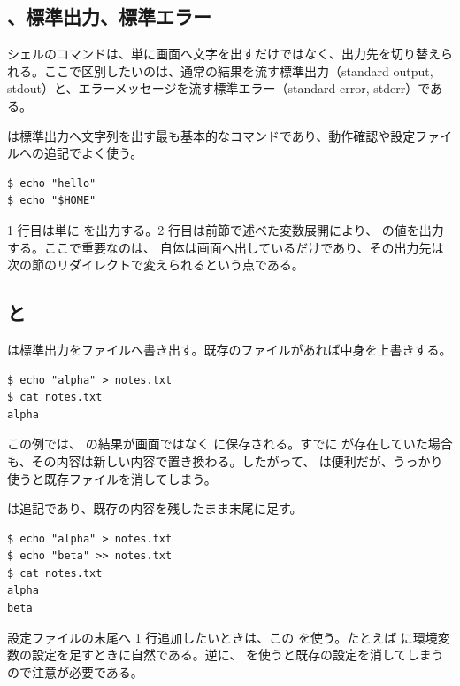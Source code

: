 \subsection{、標準出力、標準エラー}

シェルのコマンドは、単に画面へ文字を出すだけではなく、出力先を切り替えられる。ここで区別したいのは、通常の結果を流す標準出力（standard output, stdout）と、エラーメッセージを流す標準エラー（standard error, stderr）である。

 は標準出力へ文字列を出す最も基本的なコマンドであり、動作確認や設定ファイルへの追記でよく使う。

\begin{lstlisting}[numbers=none, xleftmargin=2\zw]
$ echo "hello"
$ echo "$HOME"
\end{lstlisting}

1 行目は単に  を出力する。2 行目は前節で述べた変数展開により、 の値を出力する。ここで重要なのは、 自体は画面へ出しているだけであり、その出力先は次の節のリダイレクトで変えられるという点である。

\subsection{\code{>} と \code{>>}}

\code{>} は標準出力をファイルへ書き出す。既存のファイルがあれば中身を上書きする。

\begin{lstlisting}[numbers=none, xleftmargin=2\zw]
$ echo "alpha" > notes.txt
$ cat notes.txt
alpha
\end{lstlisting}

この例では、 の結果が画面ではなく  に保存される。すでに  が存在していた場合も、その内容は新しい内容で置き換わる。したがって、\code{>} は便利だが、うっかり使うと既存ファイルを消してしまう。

\code{>>} は追記であり、既存の内容を残したまま末尾に足す。

\begin{lstlisting}[numbers=none, xleftmargin=2\zw]
$ echo "alpha" > notes.txt
$ echo "beta" >> notes.txt
$ cat notes.txt
alpha
beta
\end{lstlisting}

設定ファイルの末尾へ 1 行追加したいときは、この \code{>>} を使う。たとえば  に環境変数の設定を足すときに自然である。逆に、\code{>} を使うと既存の設定を消してしまうので注意が必要である。

